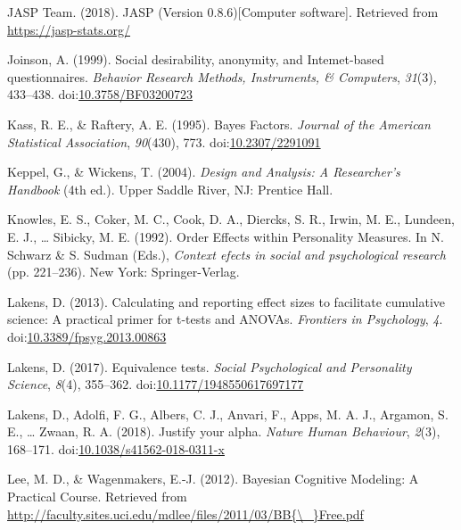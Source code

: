 \documentclass[english,man, mask]{apa6}
\theoremstyle{definition}
\theoremstyle{definition}
\theoremstyle{definition}
\theoremstyle{remark}
\begin{document}
\hypertarget{ref-JASP2018}{}
JASP Team. (2018). JASP (Version 0.8.6){[}Computer software{]}.
Retrieved from \url{https://jasp-stats.org/}

\hypertarget{ref-Joinson1999}{}
Joinson, A. (1999). Social desirability, anonymity, and Intemet-based
questionnaires. \emph{Behavior Research Methods, Instruments, \&
Computers}, \emph{31}(3), 433--438.
doi:\href{https://doi.org/10.3758/BF03200723}{10.3758/BF03200723}

\hypertarget{ref-Kass1995a}{}
Kass, R. E., \& Raftery, A. E. (1995). Bayes Factors. \emph{Journal of
the American Statistical Association}, \emph{90}(430), 773.
doi:\href{https://doi.org/10.2307/2291091}{10.2307/2291091}

\hypertarget{ref-Keppel2004}{}
Keppel, G., \& Wickens, T. (2004). \emph{Design and Analysis: A
Researcher's Handbook} (4th ed.). Upper Saddle River, NJ: Prentice Hall.

\hypertarget{ref-Knowles1992}{}
Knowles, E. S., Coker, M. C., Cook, D. A., Diercks, S. R., Irwin, M. E.,
Lundeen, E. J., \ldots{} Sibicky, M. E. (1992). Order Effects within
Personality Measures. In N. Schwarz \& S. Sudman (Eds.), \emph{Context
efects in social and psychological research} (pp. 221--236). New York:
Springer-Verlag.

\hypertarget{ref-Lakens2013}{}
Lakens, D. (2013). Calculating and reporting effect sizes to facilitate
cumulative science: A practical primer for t-tests and ANOVAs.
\emph{Frontiers in Psychology}, \emph{4}.
doi:\href{https://doi.org/10.3389/fpsyg.2013.00863}{10.3389/fpsyg.2013.00863}

\hypertarget{ref-Lakens2017a}{}
Lakens, D. (2017). Equivalence tests. \emph{Social Psychological and
Personality Science}, \emph{8}(4), 355--362.
doi:\href{https://doi.org/10.1177/1948550617697177}{10.1177/1948550617697177}

\hypertarget{ref-Lakens2017}{}
Lakens, D., Adolfi, F. G., Albers, C. J., Anvari, F., Apps, M. A. J.,
Argamon, S. E., \ldots{} Zwaan, R. A. (2018). Justify your alpha.
\emph{Nature Human Behaviour}, \emph{2}(3), 168--171.
doi:\href{https://doi.org/10.1038/s41562-018-0311-x}{10.1038/s41562-018-0311-x}

\hypertarget{ref-Lee2012}{}
Lee, M. D., \& Wagenmakers, E.-J. (2012). Bayesian Cognitive Modeling: A
Practical Course. Retrieved from
\href{http://faculty.sites.uci.edu/mdlee/files/2011/03/BB\%7B/_\%7DFree.pdf}{http://faculty.sites.uci.edu/mdlee/files/2011/03/BB\{\textbackslash{}\_\}Free.pdf}
\end{document}

